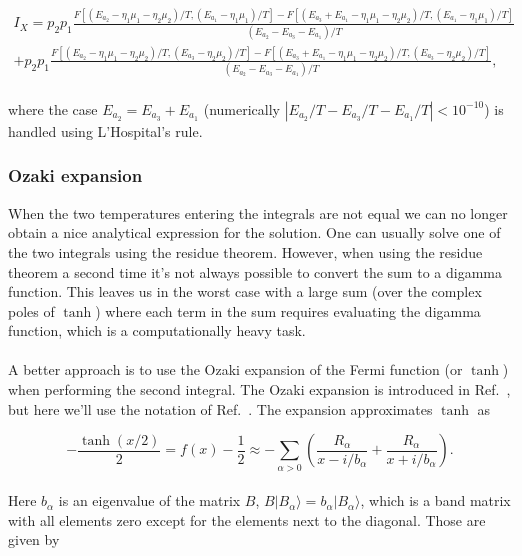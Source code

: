 \documentclass{article}
\newcommand{\ket}[1]{\ensuremath{|#1\rangle}}
\begin{document}
\begin{equation}
\begin{split}
    I_X = p_2p_1\frac{F\left [ (E_{a_2}-\eta_1\mu_1-\eta_2\mu_2)/T , (E_{a_1}-\eta_1\mu_1)/T \right ] - F\left [ (E_{a_3} + E_{a_1}-\eta_1\mu_1-\eta_2\mu_2)/T , (E_{a_1}-\eta_1\mu_1)/T \right ]}{(E_{a_2}-E_{a_3}-E_{a_1})/T} \\
    + p_2p_1\frac{F\left [ (E_{a_2}-\eta_1\mu_1-\eta_2\mu_2)/T , (E_{a_3}-\eta_2\mu_2)/T \right ] - F\left [ (E_{a_3} + E_{a_1}-\eta_1\mu_1-\eta_2\mu_2)/T , (E_{a_3}-\eta_2\mu_2)/T \right ]}{(E_{a_2}-E_{a_3}-E_{a_1})/T},
\end{split}
\end{equation}
\\
where the case $E_{a_2} = E_{a_3} + E_{a_1}$ (numerically $|E_{a_2}/T - E_{a_3}/T - E_{a_1}/T|<10^{-10}$) is handled using L'Hospital's rule.
\subsubsection{Ozaki expansion}

When the two temperatures entering the integrals are not equal we can no longer obtain a nice analytical expression for the solution. One can usually solve one of the two integrals using the residue theorem. However, when using the residue theorem a second time it's not always possible to convert the sum to a digamma function. This leaves us in the worst case with a large sum (over the complex poles of $\tanh$) where each term in the sum requires evaluating the digamma function, which is a computationally heavy task. 
\\
\\
A better approach is to use the Ozaki expansion of the Fermi function (or $\tanh$) when performing the second integral. The Ozaki expansion is introduced in Ref.~\cite{ozaki2007continued}, but here we'll use the notation of Ref.~\cite{karrasch2010finite}. The expansion approximates $\tanh$ as

\begin{equation}
    -\frac{\tanh(x/2)}{2} = f(x) - \frac{1}{2} \approx -\sum_{\alpha>0}\left( \frac{R_\alpha}{x-i/b_\alpha}+\frac{R_\alpha}{x+i/b_\alpha}\right ).
\end{equation}
\\
Here $b_\alpha$ is an eigenvalue of the matrix $B$, $B\ket{B_\alpha}=b_\alpha\ket{B_\alpha}$, which is a band matrix with all elements zero except for the elements next to the diagonal. Those are given by
\end{document}
